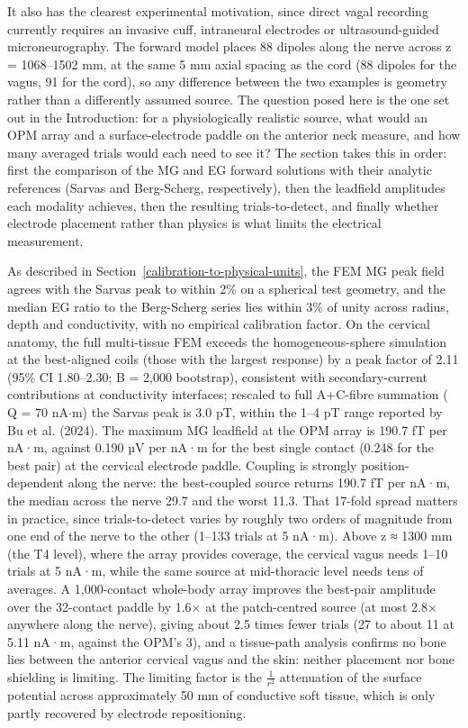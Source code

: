 \documentclass[11pt]{article}
\newcommand{\revised}[1]{#1}
\begin{document}
It also has the clearest experimental motivation, since direct vagal
recording currently requires an invasive cuff, intraneural electrodes or
ultrasound-guided microneurography. The forward model places 88 dipoles
along the nerve across \revised{z = 1068--1502 mm, at the same 5 mm axial spacing
as the cord (88 dipoles for the vagus, 91 for the cord)}, so any
difference between the two examples is geometry rather than a
differently assumed source. The question posed here is the one set out
in the Introduction: for a physiologically realistic source, what would
an OPM array and a surface-electrode paddle on the anterior neck
measure, and how many averaged trials would each need to see it? The
section takes this in order: first the comparison of the MG and EG
forward solutions with their analytic references (Sarvas and
Berg-Scherg, respectively), then the leadfield amplitudes each modality
achieves, then the resulting trials-to-detect, and finally whether
electrode placement rather than physics is what limits the electrical
measurement.

\revised{As described in Section~\ref{calibration-to-physical-units}, the FEM MG
peak field agrees with the Sarvas peak to within 2\% on a spherical test
geometry, and the median EG ratio to the Berg-Scherg series lies within 3\%
of unity across radius, depth and conductivity, with no empirical
calibration factor.} On the cervical
anatomy, the full multi-tissue FEM exceeds the homogeneous-sphere
simulation at the best-aligned coils (those with the largest response)
by a peak factor of \revised{2.11 (95\% CI 1.80--2.30; B = 2,000 bootstrap)},
consistent with secondary-current contributions at conductivity
interfaces; rescaled to full A+C-fibre summation
(\(\text{Q = 70 nA·m}\)) the Sarvas peak is \revised{3.0 pT}, within the 1--4 pT
range reported by Bu et al. (2024). The maximum MG leadfield at the OPM
array is \revised{190.7 fT per nA·m}, against
\revised{0.190 µV per nA·m for the best single contact (0.248 for the
best pair)} at the cervical electrode paddle.
Coupling is strongly position-dependent along the nerve: the
best-coupled source returns \revised{190.7} fT per nA·m, the median across the
nerve \revised{29.7} and the worst \revised{11.3}. That \revised{17-fold} spread matters in practice,
since trials-to-detect varies by roughly two orders of magnitude from
one end of the nerve to the other\revised{ (1--133 trials at 5 nA·m)}. Above z ≈ 1300 mm (the T4 level), where the array
provides coverage, the cervical vagus \revised{needs 1--10 trials at 5 nA·m}, while the same source at mid-thoracic level needs tens of
averages. \revised{A 1,000-contact whole-body array improves the best-pair amplitude
over the 32-contact paddle by 1.6× at the patch-centred source (at most
2.8× anywhere along the nerve), giving about 2.5 times fewer trials (27 to
about 11 at 5.11 nA·m, against the OPM's 3),} and a tissue-path
analysis confirms no bone lies between the anterior cervical vagus and
the skin: neither placement nor bone shielding is limiting. The limiting
factor is the \(\frac{1}{r^{2}}\) attenuation of the surface potential
across approximately 50 mm of conductive soft tissue, which \revised{is only
partly recovered by electrode repositioning}.
\end{document}
